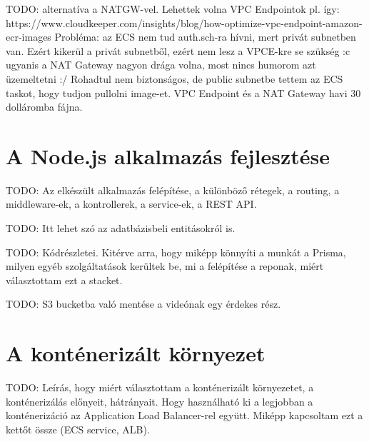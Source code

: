 TODO: alternatíva a NATGW-vel. Lehettek volna VPC Endpointok pl. így: https://www.cloudkeeper.com/insights/blog/how-optimize-vpc-endpoint-amazon-ecr-images Probléma: az ECS nem tud auth.sch-ra hívni, mert privát subnetben van. Ezért kikerül a privát subnetből, ezért nem lesz a VPCE-kre se szükség :c ugyanis a NAT Gateway nagyon drága volna, most nincs humorom azt üzemeltetni :/
Rohadtul nem biztonságos, de public subnetbe tettem az ECS taskot, hogy tudjon pullolni image-et. VPC Endpoint és a NAT Gateway havi 30 dolláromba fájna.

\section{A Node.js alkalmazás fejlesztése}

TODO: Az elkészült alkalmazás felépítése, a különböző rétegek, a routing, a middleware-ek, a kontrollerek, a service-ek, a REST API.

TODO: Itt lehet szó az adatbázisbeli entitásokról is.

TODO: Kódrészletei. Kitérve arra, hogy miképp könnyíti a munkát a Prisma, milyen egyéb szolgáltatások kerültek be, mi a felépítése a reponak, miért választottam ezt a stacket.

TODO: S3 bucketba való mentése a videónak egy érdekes rész.

\section{A konténerizált környezet}

TODO: Leírás, hogy miért választottam a konténerizált környezetet, a konténerizálás előnyeit, hátrányait. Hogy használható ki a legjobban a konténerizáció az Application Load Balancer-rel együtt. Miképp kapcsoltam ezt a kettőt össze (ECS service, ALB).

